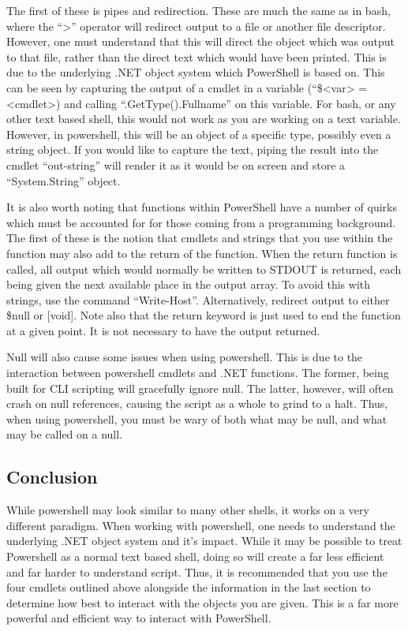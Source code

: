 			The first of these is pipes and redirection. 
			These are much the same as in bash, where the ``>'' operator will redirect output to a file or another file descriptor. 
			However, one must understand that this will direct the object which was output to that file, rather than the direct text which would have been printed. 
			This is due to the underlying .NET object system which PowerShell is based on. 
			This can be seen by capturing the output of a cmdlet in a variable (``\$<var> = <cmdlet>) and calling ``.GetType().Fullname'' on this variable.
			For bash, or any other text based shell, this would not work as you are working on a text variable. 
			However, in powershell, this will be an object of a specific type, possibly even a string object. 
			If you would like to capture the text, piping the result into the cmdlet ``out-string'' will render it as it would be on screen and store a ``System.String'' object. 

			It is also worth noting that functions within PowerShell have a number of quirks which must be accounted for for those coming from a programming background. 
			The first of these is the notion that cmdlets and strings that you use within the function may also add to the return of the function. 
			When the return function is called, all output which would normally be written to STDOUT is returned, each being given the next available place in the output array. 
			To avoid this with strings, use the command ``Write-Host''. 
			Alternatively, redirect output to either \$null or [void]. 
			Note also that the return keyword is just used to end the function at a given point. 
			It is not necessary to have the output returned. 

			Null will also cause some issues when using powershell. 
			This is due to the interaction between powershell cmdlets and .NET functions. 
			The former, being built for CLI scripting will gracefully ignore null. 
			The latter, however, will often crash on null references, causing the script as a whole to grind to a halt. 
			Thus, when using powershell, you must be wary of both what may be null, and what may be called on a null. 
			
		\subsection{Conclusion}
			While powershell may look similar to many other shells, it works on a very different paradigm. 
			When working with powershell, one needs to understand the underlying .NET object system and it's impact. 
			While it may be possible to treat Powershell as a normal text based shell, doing so will create a far less efficient and far harder to understand script. 
			Thus, it is recommended that you use the four cmdlets outlined above alongside the information in the last section to determine how best to interact with the objects you are given. 
			This is a far more powerful and efficient way to interact with PowerShell. 
